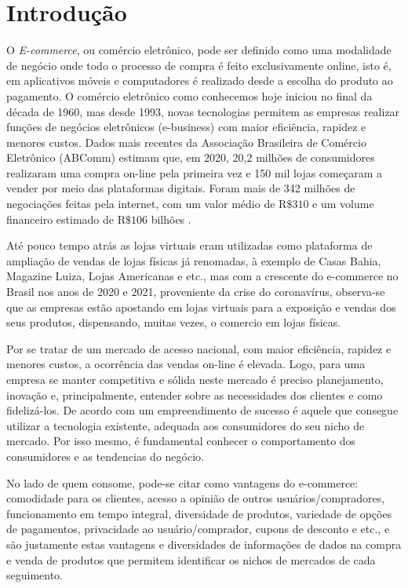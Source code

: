 \section{Introdução}
\label{sec:intro}

O \textit{E-commerce}, ou comércio eletrônico, pode ser definido como uma modalidade de negócio onde todo o processo de compra é feito exclusivamente online, isto é, em aplicativos móveis e computadores é realizado desde a escolha do produto ao pagamento. O comércio eletrônico  como conhecemos hoje iniciou no final da década de 1960, mas desde 1993, novas tecnologias permitem as empresas realizar  funções de negócios eletrônicos (e-business) com maior eficiência, rapidez e  menores custos. Dados mais recentes da Associação Brasileira de Comércio  Eletrônico (ABComm) estimam que, em 2020, 20,2 milhões de consumidores realizaram uma compra on-line pela primeira vez e 150 mil lojas começaram a  vender por meio das plataformas digitais. Foram mais de 342 milhões de  negociações feitas pela internet, com um valor médio de R$\$ 310$ e um volume financeiro estimado de R$\$ 106$ bilhões \citep{Abcomm2020}.

Até pouco tempo atrás as lojas virtuais eram utilizadas como plataforma  de ampliação de vendas de lojas físicas já renomadas, à exemplo de Casas  Bahia, Magazine Luiza, Lojas Americanas e etc., mas com a crescente do e-commerce no Brasil nos anos de 2020 e 2021, proveniente da crise do  coronavírus, observa-se que as empresas estão apostando em lojas virtuais para  a exposição e vendas dos seus produtos, dispensando, muitas vezes, o comercio  em lojas físicas.

Por se tratar de um mercado de acesso nacional, com maior eficiência, rapidez e menores custos, a ocorrência das vendas on-line é elevada. Logo, para uma  empresa se manter competitiva e sólida neste mercado é preciso planejamento,  inovação e, principalmente, entender sobre as necessidades dos clientes e como  fidelizá-los. De acordo com \cite{Efagundes2021} um empreendimento de sucesso é aquele que  consegue utilizar a tecnologia existente, adequada aos consumidores do seu  nicho de mercado. Por isso mesmo, é  fundamental conhecer o comportamento dos consumidores e as tendencias do negócio.

No lado de quem consome, pode-se citar como vantagens do e-commerce: comodidade para os  clientes, acesso a opinião de outros usuários/compradores, funcionamento em tempo integral, diversidade de produtos, variedade de opções de pagamentos,  privacidade ao usuário/comprador, cupons de desconto e etc., e são justamente  estas vantagens e diversidades de informações de dados na compra e venda de  produtos que permitem identificar os nichos de mercados de cada seguimento.


